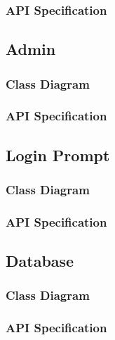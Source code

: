 \documentclass[12pt]{article}
\begin{document}
\subsubsection{API Specification}

\subsection{Admin}

\subsubsection{Class Diagram}

\subsubsection{API Specification}

\subsection{Login Prompt}

\subsubsection{Class Diagram}

\subsubsection{API Specification}

\subsection{Database}

\subsubsection{Class Diagram}

\subsubsection{API Specification}
\end{document}
